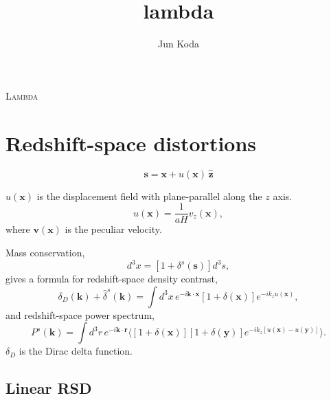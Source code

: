 \documentclass[a4paper,11pt, fleqn]{article}
\title{lambda}
\author{Jun Koda}
\date{}
\begin{document}
%
%
\vspace{0.3 \paperheight}

\begin{center}
  {\Huge \textsc{Lambda}}
\end{center}

\tableofcontents

\sectionfont{\sffamily\Huge\color{Green}\selectfont}
\subsectionfont{\sffamily\color{Green}\selectfont}
\subsubsectionfont{\sffamily\color{Green}\selectfont}
\paragraphfont{\sffamily\color{Green}\selectfont}

%
%
\newpage

\section{Redshift-space distortions}
%
\begin{equation}
  \bm{s} = \bm{x} + u(\bm{x}) \, \hat{\bm{z}}
\end{equation}

$u(\bm{x})$ is the displacement field with plane-parallel along the $z$ axis.
\begin{equation}
  u(\bm{x}) = \frac{1}{aH} v_z(\bm{x}),
\end{equation}
where $\bm{v}(\bm{x})$ is the peculiar velocity.

\vspace{5mm}

Mass conservation,
%
\begin{equation}
  [1 + \delta(\bm{x})] d^3 x = [1 + \delta^s(\bm{s})] d^3 s,
\end{equation}
%
gives a formula for redshift-space density contrast,
%
\begin{equation}
  \label{eq:delta-s}
  \delta_D(\bm{k}) + \hat{\delta}^s(\bm{k})
  = \int \! d^3 x \, e^{-i\bm{k}\cdot\bm{x}} [1 + \delta(\bm{x})]
    e^{-ik_z u(\bm{x})},
\end{equation}
%
and redshift-space power spectrum,
%
\begin{equation}
  P^s(\bm{k}) = \int \! d^3 r \, e^{-i\bm{k}\cdot\bm{r}}
  \Big\langle
      [1 + \delta(\bm{x})][1 + \delta(\bm{y})]
      e^{-ik_z [u(\bm{x}) - u(\bm{y})]}\Big\rangle.
\end{equation}
$\delta_D$ is the Dirac delta function.


\newpage
\subsection{Linear RSD}
\end{document}
